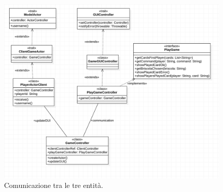 \begin{itemize}
    \begin{figure}[!tbh]
    \centering
 	 \includegraphics[width=\linewidth]{patternMediatorGameController.png}
 	 \caption{Comunicazione tra le tre entità.}
  	\label{fig:pattern_mediator}
	\end{figure}
     
     \clearpage
     

\end{itemize}
